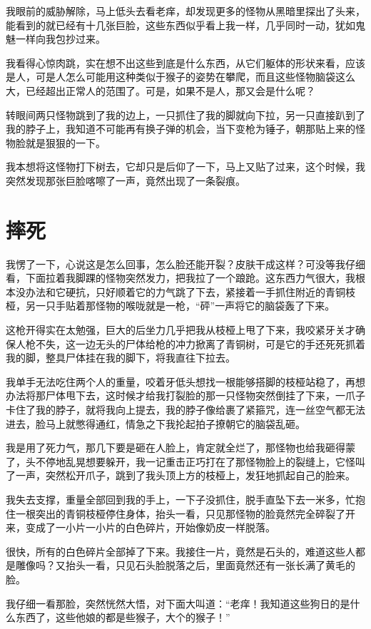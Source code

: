 我眼前的威胁解除，马上低头去看老痒，却发现更多的怪物从黑暗里探出了头来，能看到的就已经有十几张巨脸，这些东西似乎看上我一样，几乎同时一动，犹如鬼魅一样向我包抄过来。

我看得心惊肉跳，实在想不出这些到底是什么东西，从它们躯体的形状来看，应该是人，可是人怎么可能用这种类似于猴子的姿势在攀爬，而且这些怪物脑袋这么大，已经超出正常人的范围了。可是，如果不是人，那又会是什么呢？

转眼间两只怪物跳到了我的边上，一只抓住了我的脚就向下拉，另一只直接趴到了我的脖子上，我知道不可能再有换子弹的机会，当下变枪为锤子，朝那贴上来的怪物脸就是狠狠的一下。

我本想将这怪物打下树去，它却只是后仰了一下，马上又贴了过来，这个时候，我突然发现那张巨脸喀嚓了一声，竟然出现了一条裂痕。

\chapter{摔死}

我愣了一下，心说这是怎么回事，怎么脸还能开裂？皮肤干成这样？可没等我仔细看，下面拉着我脚踝的怪物突然发力，把我拉了一个踉跄。这东西力气很大，我根本没办法和它硬抗，只好顺着它的力气跳了下去，紧接着一手抓住附近的青铜枝桠，另一只手贴着那怪物的喉咙就是一枪，“砰”一声将它的脑袋轰了下来。

这枪开得实在太勉强，巨大的后坐力几乎把我从枝桠上甩了下来，我咬紧牙关才确保人枪不失，这一边无头的尸体给枪的冲力掀离了青铜树，可是它的手还死死抓着我的脚，整具尸体挂在我的脚下，将我直往下拉去。

我单手无法吃住两个人的重量，咬着牙低头想找一根能够搭脚的枝桠站稳了，再想办法将那尸体甩下去，这时候才给我打裂脸的那一只怪物突然倒挂了下来，一爪子卡住了我的脖子，就将我向上提去，我的脖子像给裹了紧箍咒，连一丝空气都无法进去，脸马上就憋得通红，情急之下我抡起拍子撩朝它的脑袋乱砸。

我是用了死力气，那几下要是砸在人脸上，肯定就全烂了，那怪物也给我砸得蒙了，头不停地乱晃想要躲开，我一记重击正巧打在了那怪物脸上的裂缝上，它怪叫了一声，突然松开爪子，跳到了我头顶上方的枝桠上，发狂地抓起自己的脸来。

我失去支撑，重量全部回到我的手上，一下子没抓住，脱手直坠下去一米多，忙抱住一根突出的青铜枝桠停住身体，抬头一看，只见那怪物的脸竟然完全碎裂了开来，变成了一小片一小片的白色碎片，开始像奶皮一样脱落。

很快，所有的白色碎片全部掉了下来。我接住一片，竟然是石头的，难道这些人都是雕像吗？又抬头一看，只见石头脸脱落之后，里面竟然还有一张长满了黄毛的脸。

我仔细一看那脸，突然恍然大悟，对下面大叫道：“老痒！我知道这些狗日的是什么东西了，这些他娘的都是些猴子，大个的猴子！”

